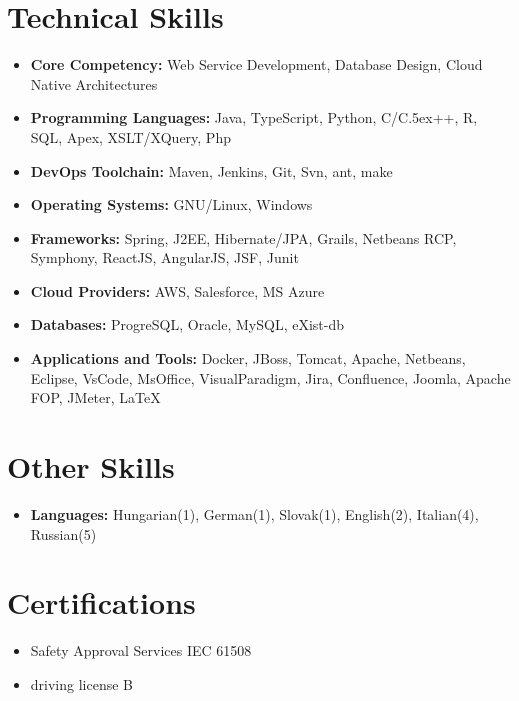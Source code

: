 \documentclass[letterpaper,11pt]{article}
\def\Cplusplus{{\rm C\raise.5ex\hbox{\tiny ++}}}
\begin{document}
\section{\bf Technical Skills}
\begin{itemize}
\item \textbf{Core Competency:} Web Service Development, Database Design, Cloud Native Architectures
\item \textbf{Programming Languages:} Java, TypeScript, Python, C/\Cplusplus, R, SQL, Apex, XSLT/XQuery, Php
\item \textbf{DevOps Toolchain:} Maven, Jenkins, Git, Svn, ant, make
\item \textbf{Operating Systems:} GNU/Linux, Windows
\item \textbf{Frameworks:} Spring, J2EE, Hibernate/JPA, Grails, Netbeans RCP, Symphony, ReactJS, AngularJS, JSF, Junit
\item \textbf{Cloud Providers:} AWS, Salesforce, MS Azure
\item \textbf{Databases:} ProgreSQL, Oracle, MySQL, eXist-db 
\item \textbf{Applications and Tools:} Docker, JBoss, Tomcat, Apache, Netbeans, Eclipse, VsCode, MsOffice, VisualParadigm, Jira, Confluence, Joomla, Apache FOP, JMeter, \LaTeX
\end{itemize}

\section{\bf Other Skills}
\begin{itemize}
\item \textbf{Languages:} Hungarian(1), German(1), Slovak(1), English(2), Italian(4), Russian(5)
\end{itemize}

\section{\bf Certifications}
\begin{itemize}
\item Safety Approval Services IEC 61508
\item driving license B
\end{itemize}

\end{document}
